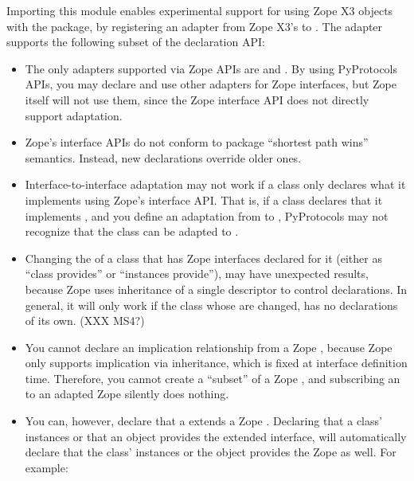 \begin{verbatim%
}
\begin{verbatim%
}
\begin{verbatim%
}
\begin{verbatim%
}
\begin{verbatim%
}
\begin{verbatim%
}
Importing this module enables experimental support for using Zope X3
 objects with the  package, by registering
an adapter from Zope X3's  to .  The
adapter supports the following subset of the declaration API:

\begin{itemize}

\item The only adapters supported via Zope APIs are 
and .  By using PyProtocols APIs, you may declare and
use other adapters for Zope interfaces, but Zope itself will not use them, since
the Zope interface API does not directly support adaptation.

\item Zope's interface APIs do not conform to  package
``shortest path wins'' semantics.  Instead, new declarations override older
ones.

\item Interface-to-interface adaptation may not work if a class only declares
what it implements using Zope's interface API.  That is, if a class declares
that it implements , and you define an adaptation from
 to , PyProtocols may not
recognize that the class can be adapted to .

\item Changing the  of a class that has Zope interfaces
declared for it (either as ``class provides'' or ``instances provide''), may
have unexpected results, because Zope uses inheritance of a single descriptor
to control declarations.  In general, it will only work if the class whose
 are changed, has no declarations of its own.  (XXX MS4?)

\item You cannot declare an implication relationship from a Zope
, because Zope only supports implication via
inheritance, which is fixed at interface definition time.  Therefore, you cannot
create a ``subset'' of a Zope , and subscribing an
 to an adapted Zope 
silently does nothing.

\item You can, however, declare that a  extends a
Zope .  Declaring that a class' instances or that an object
provides the extended interface, will automatically declare that the class'
instances or the object provides the Zope  as well.  For
example:


\end{itemize}
\end{verbatim%
}
\end{verbatim%
}
\end{verbatim%
}
\end{verbatim%
}
\end{verbatim%
}
\end{verbatim%
}
